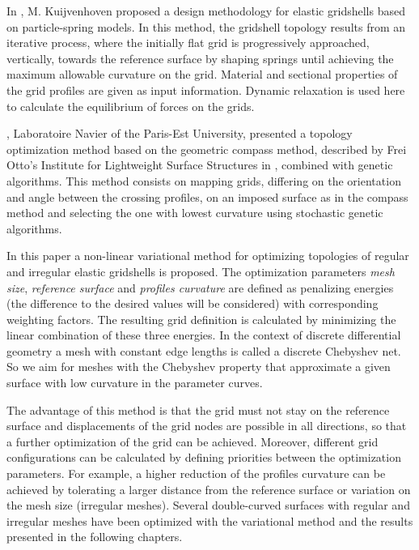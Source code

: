 \documentclass[Thesis.tex]{subfiles}
\begin{document}
In \cite{Kuijvenhoven2009}, M. Kuijvenhoven proposed a design methodology for elastic gridshells based on particle-spring models. In this method, the gridshell topology results from an iterative process, where the initially flat grid is progressively approached, vertically, towards the reference surface by shaping springs until achieving the maximum allowable curvature on the grid. Material and sectional properties of the grid profiles are given as input information. Dynamic relaxation is used here to calculate the equilibrium of forces on the grids. 

\cite{BouhayaBC2011}, Laboratoire Navier of the Paris-Est University, presented a topology optimization method based on the geometric compass method, described by Frei Otto's Institute for Lightweight Surface Structures in \cite{IL1974}, combined with genetic algorithms. This method consists on mapping grids, differing on the orientation and angle between the crossing profiles, on an imposed surface as in the compass method and selecting the one with lowest curvature using stochastic genetic algorithms.

In this paper a non-linear variational method for optimizing topologies of regular and irregular elastic gridshells is proposed. The optimization parameters {\it mesh size}, {\it reference surface} and {\it profiles curvature} are defined as penalizing energies (the difference to the desired values will be considered) with corresponding weighting factors. The resulting grid definition is calculated by minimizing the linear combination of these three energies. In the context of discrete differential geometry a mesh with constant edge lengths is called a discrete Chebyshev net. So we aim for meshes with the Chebyshev property that approximate a given surface with low curvature in the parameter curves. 

The advantage of this method is that the grid must not stay on the reference surface and displacements of the grid nodes are possible in all directions, so that a further optimization of the grid can be achieved. Moreover, different grid configurations can be calculated by defining priorities between the optimization parameters. For example, a higher reduction of the profiles curvature can be achieved by tolerating a larger distance from the reference surface or variation on the mesh size (irregular meshes). Several double-curved surfaces with regular and irregular meshes have been optimized with the variational method and the results presented in the following chapters.
\end{document}
